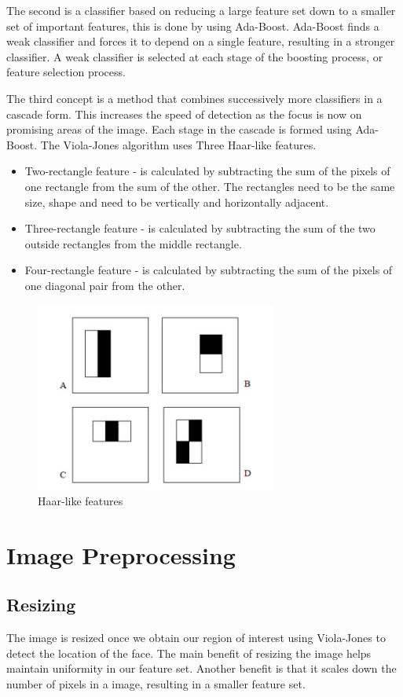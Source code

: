 \begin{flushleft}
The second is a classifier based on reducing a large feature set down to a smaller set of important features, this is done by using Ada-Boost. Ada-Boost finds a weak classifier and forces it to depend on a single feature, resulting in a stronger classifier. A weak classifier is selected at each stage of the boosting process, or feature selection process.

The third concept is a method that combines successively more classifiers in a cascade form. This increases the speed of detection as the focus is now on promising areas of the image. Each stage in the cascade is formed using Ada-Boost. The Viola-Jones algorithm uses Three Haar-like features.
\begin{itemize}
  \item Two-rectangle feature - is calculated by subtracting the sum of the pixels of one rectangle from the sum of the other. The rectangles need to be the same size, shape and need to be vertically and horizontally adjacent.
  \item Three-rectangle feature - is calculated by subtracting the sum of the two outside rectangles from the middle rectangle.
  \item Four-rectangle feature - is calculated by subtracting the sum of the pixels of one diagonal pair from the other.
\end{itemize} 
\end{flushleft}
\begin{figure}[H]
  \centering
  \includegraphics[scale=0.4]{2}
  \caption{Haar-like features}
\end{figure}

\section{Image Preprocessing}
	\subsection{Resizing} 
	The image is resized once we obtain our region of interest using Viola-Jones to detect the location of the face. The main benefit of resizing the image helps maintain uniformity in our feature set. Another benefit is that it scales down the number of pixels in a image, resulting in a smaller feature set\cite{pre}. 
